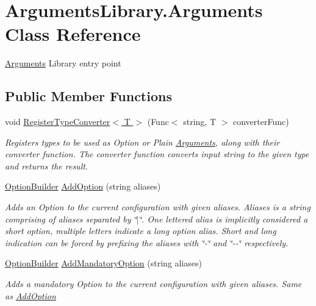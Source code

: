 \hypertarget{class_arguments_library_1_1_arguments}{\section{Arguments\+Library.\+Arguments Class Reference}
\label{class_arguments_library_1_1_arguments}
}


\hyperlink{class_arguments_library_1_1_arguments}{Arguments} Library entry point  


\subsection*{Public Member Functions}
\begin{DoxyCompactItemize}
\item 
void \hyperlink{class_arguments_library_1_1_arguments_a0438215f8f980643ab990c77184b3232}{Register\+Type\+Converter$<$ T $>$} (Func$<$ string, T $>$ converter\+Func)
\begin{DoxyCompactList}\small\item\em Registers types to be used as Option or Plain \hyperlink{class_arguments_library_1_1_arguments}{Arguments}, along with their converter function. The converter function converts input string to the given type and returns the result. \end{DoxyCompactList}\item 
\hyperlink{class_arguments_library_1_1_builders_1_1_option_builder}{Option\+Builder} \hyperlink{class_arguments_library_1_1_arguments_a15fe7ed8e0abcaff16e0c0700e0b9f9e}{Add\+Option} (string aliases)
\begin{DoxyCompactList}\small\item\em Adds an Option to the current configuration with given aliases. Aliases is a string comprising of aliases separated by \char`\"{}$\vert$\char`\"{}. One lettered alias is implicitly considered a short option, multiple letters indicate a long option alias. Short and long indication can be forced by prefixing the aliases with \char`\"{}-\/\char`\"{} and \char`\"{}-\/-\/\char`\"{} respectively. \end{DoxyCompactList}\item 
\hyperlink{class_arguments_library_1_1_builders_1_1_option_builder}{Option\+Builder} \hyperlink{class_arguments_library_1_1_arguments_ac90f288cfdd0bcd396301e9206be32a5}{Add\+Mandatory\+Option} (string aliases)
\begin{DoxyCompactList}\small\item\em Adds a mandatory Option to the current configuration with given aliases. Same as \hyperlink{class_arguments_library_1_1_arguments_a15fe7ed8e0abcaff16e0c0700e0b9f9e}{Add\+Option} \end{DoxyCompactList}\item 

\end{DoxyCompactItemize}
